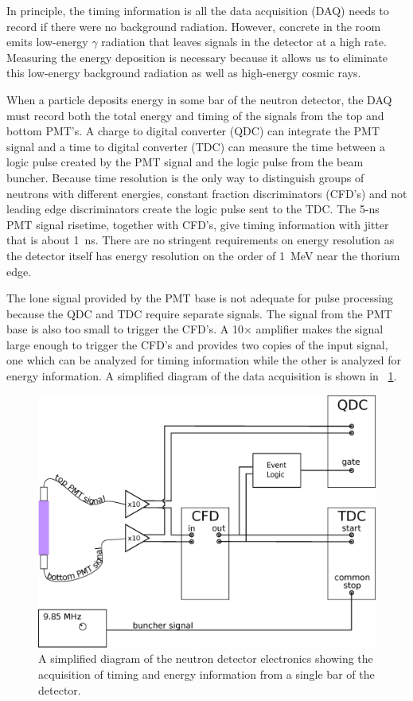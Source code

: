 In principle, the timing information is all the data acquisition (DAQ) needs to record if there were no background radiation.  However, concrete in the room emits low-energy $\gamma$ radiation that leaves signals in the detector at a high rate.  Measuring the energy deposition is necessary because it allows us to eliminate this low-energy background radiation as well as high-energy cosmic rays.

When a particle deposits energy in some bar of the neutron detector, the DAQ must record both the total energy and timing of the signals from the top and bottom PMT's.  A charge to digital converter (QDC) can integrate the PMT signal and a time to digital converter (TDC) can measure the time between a logic pulse created by the PMT signal and the logic pulse from the beam buncher.  Because time resolution is the only way to distinguish groups of neutrons with different energies, constant fraction discriminators (CFD's) and not leading edge discriminators create the logic pulse sent to the TDC.  The 5-ns PMT signal risetime, together with CFD's, give timing information with jitter that is about 1~ns.  There are no stringent requirements on energy resolution as the detector itself has energy resolution on the order of 1~MeV near the thorium edge.

The lone signal provided by the PMT base is not adequate for pulse processing because the QDC and TDC require separate signals.  The signal from the PMT base is also too small to trigger the CFD's.  A 10$\times$ amplifier makes the signal large enough to trigger the CFD's and provides two copies of the input signal, one which can be analyzed for timing information while the other is analyzed for energy information.  A simplified diagram of the data acquisition is shown in {\fig}~\ref{fig:simpleElectronics}.

\begin{figure}[htp]
\centering
\includegraphics[width=1.0\textwidth]{figures/basic_electronics.eps}
\caption[Simplified sketch of the detector electronics.]{A simplified diagram of the neutron detector electronics showing the acquisition of timing and energy information from a single bar of the detector.}
\label{fig:simpleElectronics}
\end{figure}


